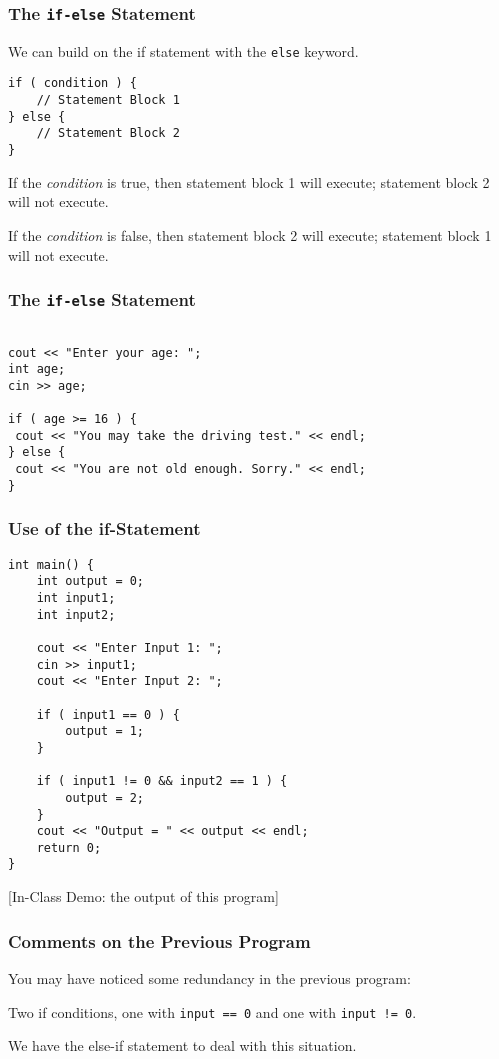 \begin{frame}[fragile]
\frametitle{The \texttt{if-else} Statement}

We can build on the if statement with the \texttt{else} keyword.

\begin{verbatim}
if ( condition ) {
    // Statement Block 1
} else {
    // Statement Block 2
}
\end{verbatim}

If the \textit{condition} is true, then statement block 1 will execute; statement block 2 will not execute.

If the \textit{condition} is false, then statement block 2 will execute; statement block 1 will not execute.


\end{frame}

\begin{frame}[fragile]
\frametitle{The \texttt{if-else} Statement}

\begin{verbatim}

cout << "Enter your age: ";
int age;
cin >> age;

if ( age >= 16 ) {
 cout << "You may take the driving test." << endl;
} else {
 cout << "You are not old enough. Sorry." << endl;
}
\end{verbatim}

\end{frame}


\begin{frame}[fragile]
\frametitle{Use of the if-Statement}

{\scriptsize
\begin{verbatim}
int main() {
    int output = 0;
    int input1;
    int input2;
    
    cout << "Enter Input 1: ";
    cin >> input1;
    cout << "Enter Input 2: ";
    
    if ( input1 == 0 ) {
        output = 1; 
    }

    if ( input1 != 0 && input2 == 1 ) {				
        output = 2; 			
    }				
    cout << "Output = " << output << endl;
    return 0;    
}
\end{verbatim}
}

[In-Class Demo: the output of this program]

\end{frame}

\begin{frame}
\frametitle{Comments on the Previous Program}

You may have noticed some redundancy in the previous program:


Two if conditions, one with \texttt{input == 0} and one with \texttt{input != 0}.

We have the else-if statement to deal with this situation.

\end{frame}

